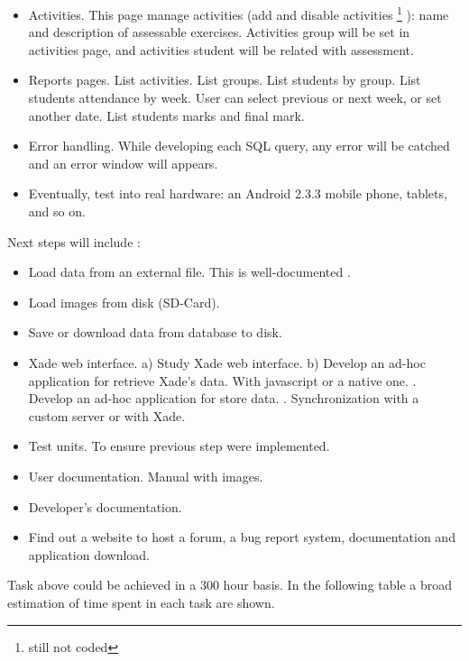 \begin{itemize}
  \item  Activities. This page manage activities (add and disable activities \footnote{still not coded} ): name and description of assessable exercises. 
  \subitem  Activities group will be set in activities page, and activities student will be related with assessment.
  \item Reports pages.
  \subitem  List activities.
  \subitem  List groups.
  \subitem  List students by group.
  \subitem  List students attendance by week. User can select previous or next week, or set another date.
  \subitem  List students marks and final mark.
  
  \item Error handling. While developing each SQL query, any error will be catched and an error window will appears. 
  \item Eventually, test into real hardware: an Android 2.3.3 mobile phone, tablets, and so on.
  \end{itemize}
  
	   Next steps will include :  
  \begin{itemize}
  \item   Load data from an external file. This is well-documented \cite{PhoneGapLS}.  
  \item   Load images from disk (SD-Card).
  \item  Save or download data from database to disk.
  \item  Xade web interface.
  \subitem    a) Study Xade web interface.
  \subitem    b) Develop an ad-hoc application for retrieve Xade's data. With javascript or a native one. 
  . Develop an ad-hoc application for store data. 
  . Synchronization with a custom server or with Xade.
  \item   Test units. To ensure previous step were implemented.
  \item   User documentation. Manual with images.
  \item   Developer's documentation.
  \item   Find out a website to host a forum, a bug report system,  documentation and application download.
	\end{itemize}

Task above could be achieved in a 300 hour basis.	
In the following table a broad estimation of time spent in each task are shown.  


